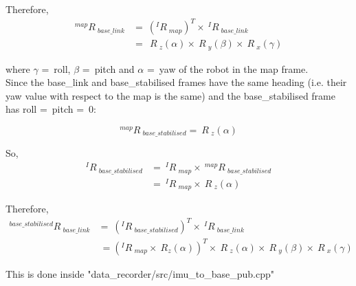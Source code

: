 \documentclass{article}
\begin{document}
Therefore,
\begin{align}
^{map}R\ _{base\_link} & =\ (^{I}R\ _{map})^T \times\  ^{I}R\ _{base\_link}\\
 & =\ \ R\ _z(\alpha) \times\  R\ _y(\beta) \times\  R\ _x(\gamma) 
\end{align}

where $\gamma$ =\ roll, $\beta$ =\ pitch and $\alpha$ =\ yaw of the robot in the map frame.\\

Since the base\_link and base\_stabilised frames have the same heading (i.e. their yaw value with respect to the map is the same) and the base\_stabilised frame has roll =\ pitch =\ 0:

\begin{equation}
^{map}R\ _{base\_stabilised} =\ R\ _z(\alpha) 
\end{equation}

So,
\begin{align}
^{I}R\ _{base\_stabilised} & =\ ^{I}R\ _{map} \times\  ^{map}R\ _{base\_stabilised}\\
 & =\ ^{I}R\ _{map} \times\  R\ _z(\alpha) 
\end{align}

Therefore,
\begin{align}
^{base\_stabilised}R\ _{base\_link} &=\ (^{I}R\ _{base\_stabilised})^T \times\  ^{I}R\ _{base\_link}\\
 &\ = (^{I}R\ _{map} \times\  R_z(\alpha))^T \times\  R\ _z(\alpha) \times\  R\ _y(\beta) \times\  R\ _x(\gamma) 
\end{align}

This is done inside "data\_recorder/src/imu\_to\_base\_pub.cpp"
\end{document}
